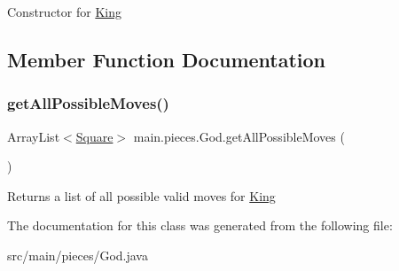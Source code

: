 Constructor for \hyperlink{classmain_1_1pieces_1_1_king}{King} 

\subsection{Member Function Documentation}
\mbox{\label{classmain_1_1pieces_1_1_god_a1c381fdce437b04c1c16f2881760e9d5}} 
\subsubsection{\texorpdfstring{get\+All\+Possible\+Moves()}{getAllPossibleMoves()}}
{\footnotesize\ttfamily Array\+List$<$\hyperlink{classmain_1_1_square}{Square}$>$ main.\+pieces.\+God.\+get\+All\+Possible\+Moves (\begin{DoxyParamCaption}{ }\end{DoxyParamCaption})\hspace{0.3cm}{\ttfamily [inline]}}

Returns a list of all possible valid moves for \hyperlink{classmain_1_1pieces_1_1_king}{King} 

The documentation for this class was generated from the following file\+:\begin{DoxyCompactItemize}
\item 
src/main/pieces/God.\+java\end{DoxyCompactItemize}
